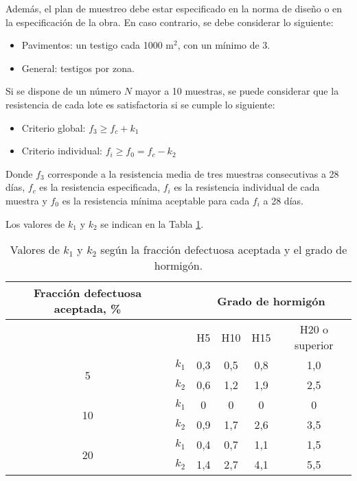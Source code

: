 Además, el plan de muestreo debe estar especificado en la norma de diseño o en la especificación de la obra. En caso contrario, se debe considerar lo siguiente:

\begin{itemize}
    \item Pavimentos: un testigo cada 1000 m$^2$, con un mínimo de 3.
    \item General: testigos por zona.
\end{itemize}

Si se dispone de un número $N$ mayor a 10 muestras, se puede considerar que la resistencia de cada lote es satisfactoria si se cumple lo siguiente:

\begin{itemize}
    \item Criterio global: $f_3 \geq f_c + k_1$
    \item Criterio individual: $f_i \geq f_0 = f_c - k_2$
\end{itemize}

Donde $f_3$ corresponde a la resistencia media de tres muestras consecutivas a 28 días, $f_c$ es la resistencia especificada, $f_i$ es la resistencia individual de cada muestra y $f_0$ es la resistencia mínima aceptable para cada $f_i$ a 28 días.

Los valores de $k_1$ y $k_2$ se indican en la Tabla \ref{tab:valoresk}.

\begin{table}[H]
\centering
\begin{tabular}{|c|c|c|c|c|c|}
\hline
\textbf{Fracción defectuosa aceptada, \%} &  & \multicolumn{4}{c|}{\textbf{Grado de hormigón}} \\ \hline
 &  & H5 & H10 & H15 & H20 o superior \\ \hline
\multirow{2}{*}{5}  & $k_{1}$ & 0,3 & 0,5 & 0,8 & 1,0 \\ \cline{2-6}
                    & $k_{2}$ & 0,6 & 1,2 & 1,9 & 2,5 \\ \hline
\multirow{2}{*}{10} & $k_{1}$ & 0   & 0   & 0   & 0   \\ \cline{2-6}
                    & $k_{2}$ & 0,9 & 1,7 & 2,6 & 3,5 \\ \hline
\multirow{2}{*}{20} & $k_{1}$ & 0,4 & 0,7 & 1,1 & 1,5 \\ \cline{2-6}
                    & $k_{2}$ & 1,4 & 2,7 & 4,1 & 5,5 \\ \hline
\end{tabular}
\caption{Valores de $k_{1}$ y $k_{2}$ según la fracción defectuosa aceptada y el grado de hormigón.}
\label{tab:valoresk}
\end{table}

